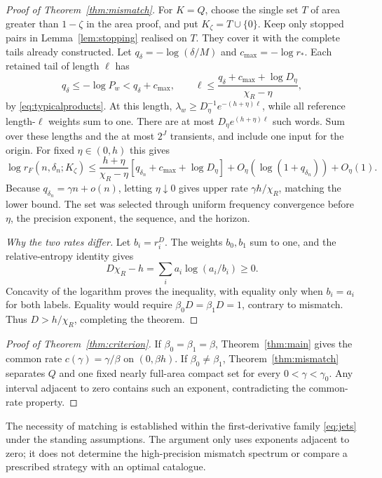 \documentclass[11pt]{amsart}
\theoremstyle{definition}
\theoremstyle{remark}
\numberwithin{equation}{section}
\begin{document}
\begin{proof}[Proof of Theorem~\ref{thm:mismatch}]
For $K=Q$, choose the single set $T$ of area greater than $1-\zeta$
in the area proof, and put $K_\zeta=T\cup\{0\}$.
Keep only stopped pairs in Lemma~\ref{lem:stopping} realised on $T$.
They cover it with the complete tails already constructed.
Let $q_\delta=-\log(\delta/M)$ and $c_{\max}=-\log r_*$.
Each retained tail of length $\ell$ has
\[
q_\delta\le-\log P_w<q_\delta+c_{\max},\qquad
\ell\le\frac{q_\delta+c_{\max}+\log D_{\eta}}{\chi_R-\eta},
\]
by \eqref{eq:typicalproducts}. At this length,
$\lambda_w\ge D_{\eta}^{-1}e^{-(h+\eta)\ell}$, while all reference
length-$\ell$ weights sum to one. There are at most
$D_{\eta}e^{(h+\eta)\ell}$ such words. Sum over these lengths and the
at most $2^J$ transients, and include one input for the origin.
For fixed $\eta\in(0,h)$ this gives
\begin{equation}\label{eq:typicalstop}
\log r_F(n,\delta_n;K_\zeta)
\le\frac{h+\eta}{\chi_R-\eta}
[q_{\delta_n}+c_{\max}+\log D_{\eta}]
+O_{\eta}(\log(1+q_{\delta_n}))+O_{\eta}(1).
\end{equation}
Because $q_{\delta_n}=\gamma n+o(n)$, letting $\eta\downarrow0$
gives upper rate $\gamma h/\chi_R$, matching the lower bound.
The set was selected through uniform frequency convergence before
$\eta$, the precision exponent, the sequence, and the horizon.

\smallskip
\emph{Why the two rates differ.}
Let $b_i=r_i^D$. The weights $b_0,b_1$ sum to one, and the
relative-entropy identity gives
\[
D\chi_R-h=\sum_i a_i\log(a_i/b_i)\ge0.
\]
Concavity of the logarithm proves the inequality, with equality
only when $b_i=a_i$ for both labels. Equality would require
$\beta_0D=\beta_1D=1$, contrary to mismatch.
Thus $D>h/\chi_R$, completing the theorem.
\end{proof}

\begin{proof}[Proof of Theorem~\ref{thm:criterion}]
If $\beta_0=\beta_1=\beta$, Theorem~\ref{thm:main} gives
the common rate $c(\gamma)=\gamma/\beta$ on $(0,\beta h)$.
If $\beta_0\ne\beta_1$, Theorem~\ref{thm:mismatch} separates
$Q$ and one fixed nearly full-area compact set for every
$0<\gamma<\gamma_0$. Any interval adjacent to zero contains
such an exponent, contradicting the common-rate property.
\end{proof}

The necessity of matching is established within the first-derivative
family \eqref{eq:jets} under the standing assumptions. The argument
only uses exponents adjacent to zero; it does not determine the
high-precision mismatch spectrum or compare a prescribed strategy
with an optimal catalogue.
\end{document}
